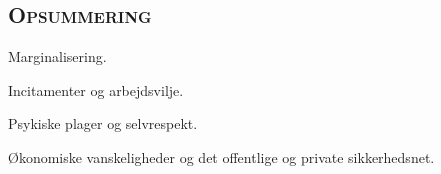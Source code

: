 \subsection{\textsc{Opsummering}}

Marginalisering. %

Incitamenter og arbejdsvilje. %

Psykiske plager og selvrespekt. %

Økonomiske vanskeligheder og det offentlige og private sikkerhedsnet. %






